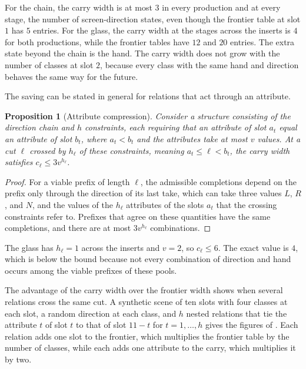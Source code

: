 \documentclass[11pt,twoside,openright]{book}
\theoremstyle{plain}
\newtheorem{proposition}[theorem]{Proposition}
\theoremstyle{definition}
\theoremstyle{remark}
\begin{document}
For the chain, the carry width is at most $3$ in every production and at every stage, the number of screen-direction states, even though the frontier table at slot $1$ has $5$ entries. For the glass, the carry width at the stages across the inserts is $4$ for both productions, while the frontier tables have $12$ and $20$ entries. The extra state beyond the chain is the hand. The carry width does not grow with the number of classes at slot $2$, because every class with the same hand and direction behaves the same way for the future.

The saving can be stated in general for relations that act through an attribute.

\begin{proposition}[Attribute compression]\label{prop:attr}
Consider a structure consisting of the direction chain and $h$ constraints, each requiring that an attribute of slot $a_t$ equal an attribute of slot $b_t$, where $a_t<b_t$ and the attributes take at most $v$ values. At a cut $\ell$ crossed by $h_\ell$ of these constraints, meaning $a_t\le\ell<b_t$, the carry width satisfies $c_\ell\le3v^{h_\ell}$.
\end{proposition}

\begin{proof}
For a viable prefix of length $\ell$, the admissible completions depend on the prefix only through the direction of its last take, which can take three values $L$, $R$, and $N$, and the values of the $h_\ell$ attributes of the slots $a_t$ that the crossing constraints refer to. Prefixes that agree on these quantities have the same completions, and there are at most $3v^{h_\ell}$ combinations.
\end{proof}

The glass has $h_\ell=1$ across the inserts and $v=2$, so $c_\ell\le6$. The exact value is $4$, which is below the bound because not every combination of direction and hand occurs among the viable prefixes of these pools.

The advantage of the carry width over the frontier width shows when several relations cross the same cut. A synthetic scene of ten slots with four classes at each slot, a random direction at each class, and $h$ nested relations that tie the attribute $t$ of slot $t$ to that of slot $11-t$ for $t=1,\dots,h$ gives the figures of . Each relation adds one slot to the frontier, which multiplies the frontier table by the number of classes, while each adds one attribute to the carry, which multiplies it by two.
\end{document}
